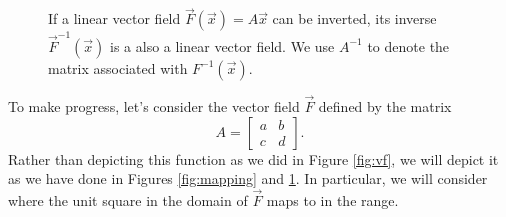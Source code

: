 \documentclass[../book.tex]{subfiles}
\begin{document}
\begin{figure}[htbp]
  \centering
  \caption{If a linear vector field \(\vec{F}(\vec{x})=A \vec{x}\) can be inverted, its inverse \(\vec{F}^{-1}(\vec{x})\) is a also a linear vector field.  We use \(A^{-1}\) to denote the matrix associated with \(F^{-1}(\vec{x})\).}
  \label{fig:mapping_inv}
\end{figure}

To make progress, let's consider the vector field \(\vec{F}\) defined by the matrix
\begin{equation}\label{eq:vec-38}
A
=
\begin{bmatrix}
  a & b \\
  c & d
\end{bmatrix}.
\end{equation}
Rather than depicting this function as we did in Figure \ref{fig:vf}, we will depict it as we have done in Figures \ref{fig:mapping} and \ref{fig:mapping_inv}. In particular, we will consider where the unit square in the domain of \(\vec{F}\) maps to in the range.
\end{document}
